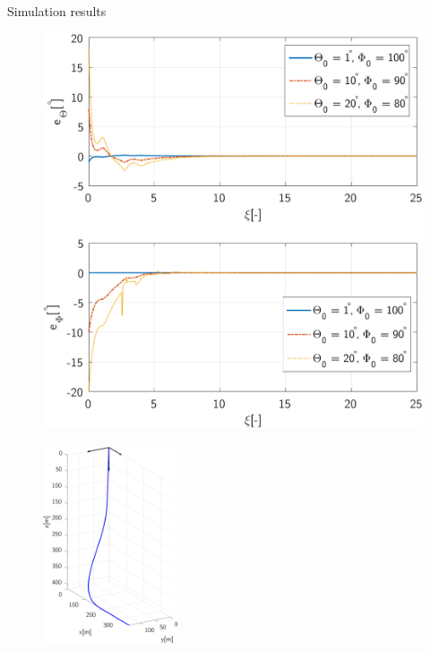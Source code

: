 \documentclass[10pt]{beamer}
\begin{document}
\begin{frame}{Simulation results}
\begin{figure}[t]
	\centering
	\begin{minipage}[b]{0.5\textwidth}
		\centering
		\includegraphics[height=1.1\textwidth]{ErrorsNeutral.pdf}
		\label{fig:ReferenceTrajectoryThetaPhi} 
	\end{minipage}
	\begin{minipage}[b]{0.45\textwidth}
		\centering
		\includegraphics[height=2.3in]{ReferenceTrajectory.pdf}
		\label{fig:ReferenceTrajectoryV} 
	\end{minipage}
\end{figure}
\end{frame}
\end{document}
